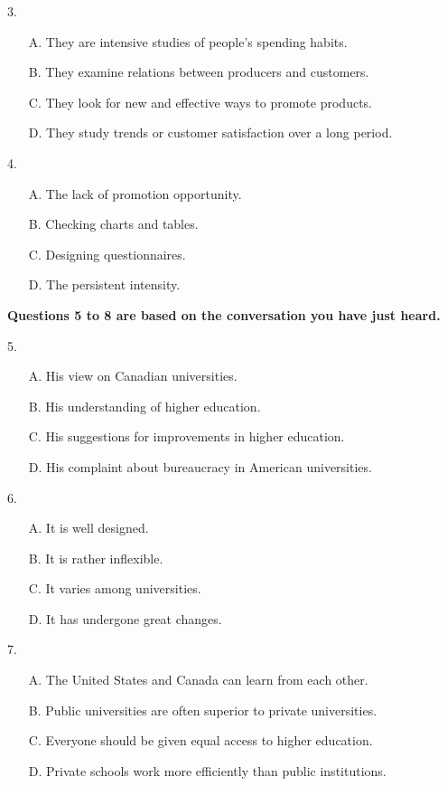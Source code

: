 \documentclass[UTF8,11pt]{ctexart}
\begin{document}
3.


\begin{itemize}[leftmargin=2em,itemsep=.2em,topsep=.4em]\item[A.] They are intensive studies of people’s spending habits.
\item[B.] They examine relations between producers and customers.
\item[C.] They look for new and effective ways to promote products.
\item[D.] They study trends or customer satisfaction over a long period.
\end{itemize}

4.


\begin{itemize}[leftmargin=2em,itemsep=.2em,topsep=.4em]\item[A.] The lack of promotion opportunity.
\item[B.] Checking charts and tables.
\item[C.] Designing questionnaires.
\item[D.] The persistent intensity.
\end{itemize}

\textbf{Questions 5 to 8 are based on the conversation you have just heard.}


5.


\begin{itemize}[leftmargin=2em,itemsep=.2em,topsep=.4em]\item[A.] His view on Canadian universities.
\item[B.] His understanding of higher education.
\item[C.] His suggestions for improvements in higher education.
\item[D.] His complaint about bureaucracy in American universities.
\end{itemize}

6.


\begin{itemize}[leftmargin=2em,itemsep=.2em,topsep=.4em]\item[A.] It is well designed.
\item[B.] It is rather inflexible.
\item[C.] It varies among universities.
\item[D.] It has undergone great changes.
\end{itemize}

7.


\begin{itemize}[leftmargin=2em,itemsep=.2em,topsep=.4em]\item[A.] The United States and Canada can learn from each other.
\item[B.] Public universities are often superior to private universities.
\item[C.] Everyone should be given equal access to higher education.
\item[D.] Private schools work more efficiently than public institutions.
\end{itemize}
\end{document}
